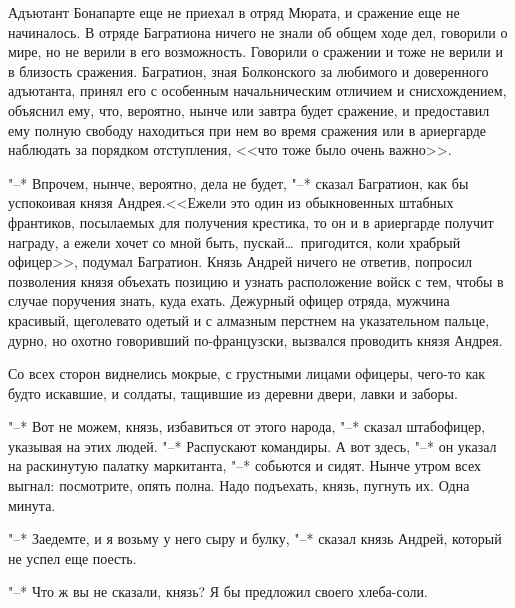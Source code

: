 Адъютант Бонапарте еще не приехал в отряд Мюрата, и сражение
еще не начиналось. В отряде Багратиона ничего не знали об общем ходе
дел, говорили о мире, но не верили в его возможность. Говорили о сражении и тоже не верили и в близость сражения. Багратион, зная Болконского за любимого и доверенного адъютанта, принял его с особенным
начальническим отличием и снисхождением, объяснил ему, что, вероятно, нынче или завтра будет сражение, и предоставил ему полную свободу
находиться при нем во время сражения или в ариергарде наблюдать за
порядком отступления, <<что тоже было очень важно>>.

"--* Впрочем, нынче, вероятно, дела не будет, "--* сказал Багратион, как
бы успокоивая князя Андрея.<<Ежели это один из обыкновенных штабных франтиков, посылаемых для получения крестика, то он и в ариергарде получит награду, а ежели хочет со мной быть, пускай\ldots~пригодится, коли храбрый офицер>>, подумал Багратион. 
Князь Андрей ничего не ответив, попросил позволения князя объехать позицию и узнать расположение войск с тем, чтобы в случае поручения знать, куда ехать.
Дежурный офицер отряда, мужчина красивый, щеголевато одетый и с
алмазным перстнем на указательном пальце, дурно, но охотно говоривший по-французски, вызвался проводить князя Андрея.

Со всех сторон виднелись мокрые, с грустными лицами офицеры,
чего-то как будто искавшие, и солдаты, тащившие из деревни двери,
лавки и заборы.

"--* Вот не можем, князь, избавиться от этого народа, "--* сказал штабофицер, указывая на этих людей. "--* Распускают командиры. А вот здесь,
"--* он указал на раскинутую палатку маркитанта, "--* собьются и сидят.
Нынче утром всех выгнал: посмотрите, опять полна. Надо подъехать,
князь, пугнуть их. Одна минута.

"--* Заедемте, и я возьму у него сыру и булку, "--* сказал князь Андрей,
который не успел еще поесть.

"--* Что ж вы не сказали, князь? Я бы предложил своего хлеба-соли.